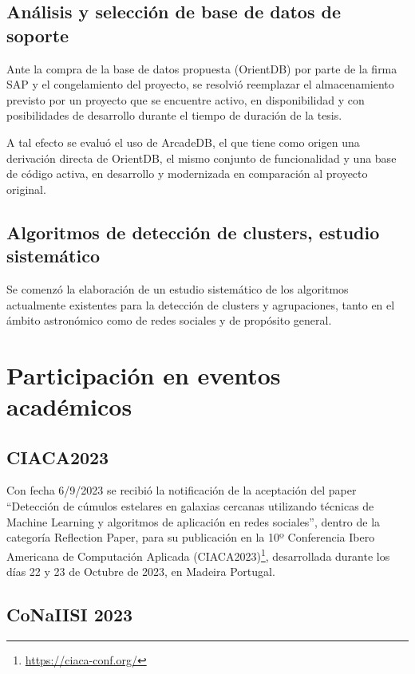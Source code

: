\documentclass[
	11pt,oneside,a4paper,
	fleqn,
	article
]{memoir}
\begin{document}
\subsection{Análisis y selección de base de datos de soporte}

Ante la compra de la base de datos propuesta (OrientDB) por parte de la firma SAP y el congelamiento del proyecto, se resolvió reemplazar el almacenamiento previsto por un proyecto que se encuentre activo, en disponibilidad y con posibilidades de desarrollo durante el tiempo de duración de la tesis.

A tal efecto se evaluó el uso de ArcadeDB, el que tiene como origen una derivación directa de OrientDB, el mismo conjunto de funcionalidad y una base de código activa, en desarrollo y modernizada en comparación al proyecto original\cite{ArcadeDB}.

\subsection{Algoritmos de detección de clusters, estudio sistemático}

Se comenzó la elaboración de un estudio sistemático de los algoritmos actualmente existentes para la detección de clusters y agrupaciones, tanto en el ámbito astronómico\cite{Schmeja2011} como de redes sociales y de propósito general\cite{ahmad2019survey}.

\section {Participación en eventos académicos}

\subsection{CIACA2023}

Con fecha 6/9/2023 se recibió la notificación de la aceptación del paper ``Detección de cúmulos estelares en galaxias cercanas utilizando técnicas de Machine Learning y algoritmos de aplicación en redes sociales'', dentro de la categoría Reflection Paper, para su publicación en la 10º Conferencia Ibero Americana de Computación Aplicada (CIACA2023)\footnote{\href{https://ciaca-conf.org/}{https://ciaca-conf.org/}}, desarrollada durante los días 22 y 23 de Octubre de 2023, en Madeira Portugal.

\subsection{CoNaIISI 2023}
\end{document}
